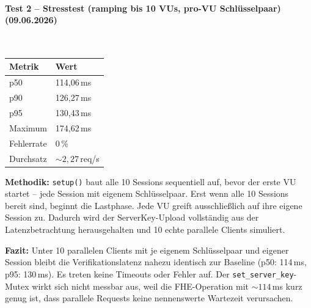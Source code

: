 \paragraph{Test 2 -- Stresstest (ramping bis 10 VUs, pro-VU Schlüsselpaar) (09.06.2026)}
\mbox{}\\
\begin{table}[H]
\centering
\begin{tabular}{||l|l||}
    \hline
    \textbf{Metrik} & \textbf{Wert} \\
    \hline\hline
    p50 & 114{,}06\,ms \\
    \hline
    p90 & 126{,}27\,ms \\
    \hline
    p95 & 130{,}43\,ms \\
    \hline
    Maximum & 174{,}62\,ms \\
    \hline
    Fehlerrate & 0\,\% \\
    \hline
    Durchsatz & ${\sim}2{,}27$\,req/s \\
    \hline
\end{tabular}
\end{table}

\textbf{Methodik:} \texttt{setup()} baut alle 10 Sessions sequentiell auf, bevor der erste VU startet -- jede Session mit eigenem Schlüsselpaar.
Erst wenn alle 10 Sessions bereit sind, beginnt die Lastphase. Jede VU greift ausschließlich auf ihre eigene Session zu.
Dadurch wird der ServerKey-Upload vollständig aus der Latenzbetrachtung herausgehalten und 10 echte parallele Clients simuliert.

\textbf{Fazit:} Unter 10 parallelen Clients mit je eigenem Schlüsselpaar und eigener Session bleibt die Verifikationslatenz nahezu identisch zur Baseline (p50: 114\,ms, p95: 130\,ms).
Es treten keine Timeouts oder Fehler auf. Der \texttt{set\_server\_key}-Mutex wirkt sich nicht messbar aus, weil die FHE-Operation mit ${\sim}114$\,ms kurz genug ist, dass parallele Requests keine nennenswerte Wartezeit verursachen.

